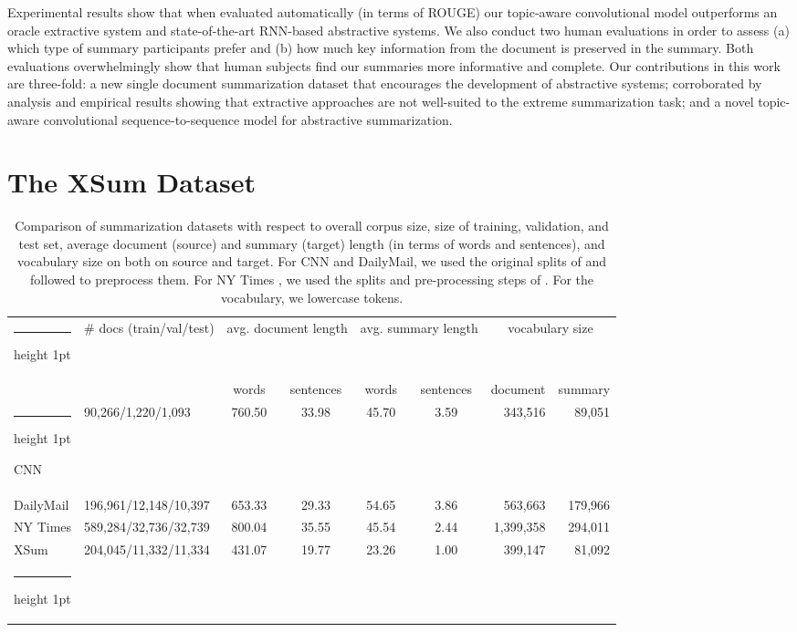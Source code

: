 \documentclass[11pt,a4paper]{article}
\makeatletter
\newcommand{\thickhline}{\noalign {\ifnum 0=`}\fi \hrule height 1pt
    \futurelet \reserved@a \@xhline
}
\makeatother
\begin{document}
Experimental results show that when evaluated automatically (in terms
of ROUGE) our topic-aware convolutional model outperforms an oracle
extractive system and state-of-the-art RNN-based abstractive
systems. We also conduct two human evaluations in order to assess (a)
which type of summary participants prefer and (b) how much key
information from the document is preserved in the summary. Both
evaluations overwhelmingly show that human subjects find our summaries
more informative and complete. Our contributions in this work are
three-fold: a new single document summarization dataset that
encourages the development of abstractive systems; corroborated by
analysis and empirical results showing that extractive approaches are
not well-suited to the extreme summarization task; and a novel
topic-aware convolutional sequence-to-sequence model for abstractive
summarization.





 

\section{The XSum Dataset}
\label{sec:bbcdataset}



\begin{table*}
  \begin{center}{\footnotesize
  \begin{tabular}{ l | l | c c | c c | r r}
    \thickhline
    \multirow{2}{*}{Datasets} & \multirow{2}{*}{\# docs (train/val/test)} & \multicolumn{2}{c|}{avg. document length} & \multicolumn{2}{c|}{avg. summary length} & \multicolumn{2}{c}{vocabulary size}\\
    & & words & sentences & words & sentences & document & summary\\ \thickhline 
    CNN & 90,266/1,220/1,093 & 760.50 & 33.98 & 45.70 & 3.59 & 343,516 & 89,051 \\
    DailyMail & 196,961/12,148/10,397 & 653.33 & 29.33 & 54.65 & 3.86 & 563,663 & 179,966 \\
    NY Times & 589,284/32,736/32,739 & 800.04 & 35.55 & 45.54 & 2.44 & 1,399,358 & 294,011 \\
    XSum & 204,045/11,332/11,334 & 431.07 & 19.77 & 23.26 & 1.00 & 399,147 & 81,092 \\ \thickhline
  \end{tabular}}
  \end{center}
  \caption{Comparison of summarization datasets
    with respect to overall corpus size, size of training, validation,
    and test set, average document (source) and summary (target)
    length (in terms of words and sentences), and  vocabulary size on
    both on source and target. For CNN and DailyMail,
    we  used the original splits of
    \protect{} and followed
    \protect{} to preprocess them. For  NY
    Times  \protect\cite{nytcorpus}, we  used the splits
    and pre-processing steps of
    \protect{}. For the vocabulary, we
    lowercase tokens.} \label{table:bbc-size-comparison} 
\end{table*}
\end{document}
